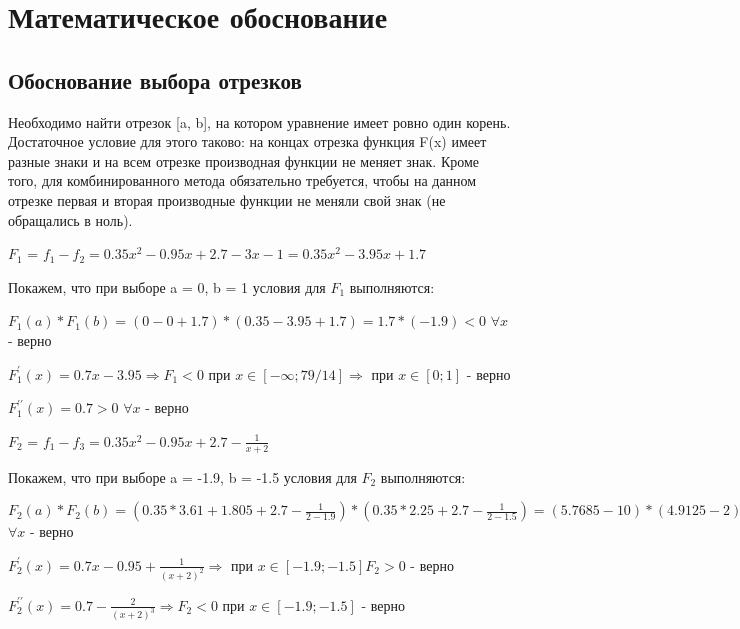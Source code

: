 \documentclass[a4paper,12pt,titlepage,finall]{article}
\begin{document}
\newpage

\section{Математическое обоснование}


\subsection{Обоснование выбора отрезков}

Необходимо найти отрезок [a, b], на котором уравнение имеет ровно один корень.
Достаточное условие для этого таково: на концах отрезка функция F(x) имеет разные знаки и на всем отрезке производная функции не меняет знак. Кроме того, для комбинированного метода обязательно требуется, чтобы на данном отрезке первая и вторая производные функции не меняли свой знак (не обращались в ноль).~\cite{math}

\vspace{\baselineskip}

$F_1$ = $f_1 - f_2 = 0.35x^2-0.95x+2.7-3x-1 = 0.35x^2-3.95x+1.7$

Покажем, что при выборе a = 0, b = 1 условия для $F_1$ выполняются:

$F_1(a)*F_1(b) = (0-0+1.7)*(0.35-3.95+1.7) = 1.7*(-1.9) < 0$ $\forall x$ - верно

$F_1^\prime(x) = 0.7x-3.95 \Rightarrow F_1 < 0$ при $x \in [-\infty; 79/14] \Rightarrow$ при $x \in [0; 1]$ - верно

$F_1^{\prime\prime}(x) = 0.7 > 0$ $\forall x$ - верно

\vspace{\baselineskip}

$F_2$ = $f_1 - f_3 = 0.35x^2-0.95x+2.7-\frac{1}{x+2}$

Покажем, что при выборе a = -1.9, b = -1.5 условия для $F_2$ выполняются:

$F_2(a)*F_2(b) = (0.35*3.61+1.805+2.7-\frac{1}{2-1.9})*(0.35*2.25+2.7-\frac{1}{2-1.5}) = (5.7685-10)*(4.9125-2) < 0$ $\forall x$ - верно

$F_2^\prime(x) = 0.7x-0.95 + \frac{1}{(x+2)^2} \Rightarrow$  при $x \in [-1.9; -1.5] F_2 > 0$ - верно

$F_2^{\prime\prime}(x) = 0.7 -\frac{2}{(x+2)^3} \Rightarrow F_2 < 0$ при $x \in [-1.9; -1.5]$ - верно
\end{document}
